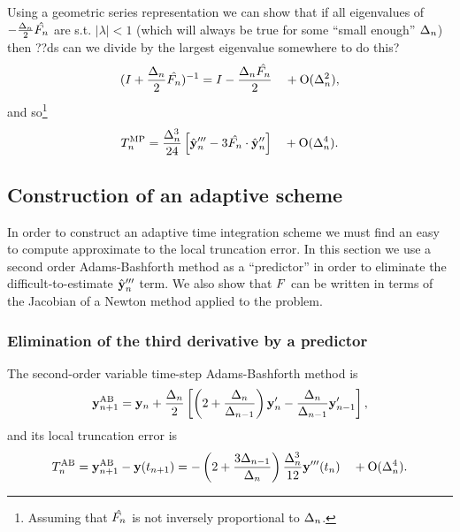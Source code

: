 Using a geometric series representation we can show that if all eigenvalues of  $-\frac{\Delta_{n}}{2}\hat{F_{n}}$ are s.t. $|\lambda| < 1$\cite{??ds} (which will always be true for some ``small enough'' $\Delta_{n}$) then
??ds can we divide by the largest eigenvalue somewhere to do this?
\begin{equation}
  (I + \frac{\Delta_{n}}{2}\hat{F_{n}})^{-1} = I - \frac{\Delta_{n} \hat{F_{n}}}{2}  \quad + \text{O}(\Delta_{n}^2),
\end{equation}
and so\footnote{Assuming that $\hat{F_{n}}$ is not inversely proportional to $\Delta_{n}$.}
\begin{equation}
   T_n^{\text{MP}} = \frac{\Delta_{n}^3}{24} \left[\hat{\mathbf{y}}_{n}''' - 3 \hat{F_{n}} \cdot \hat{\mathbf{y}}_{n}'' \right]
   \quad +\text{O}(\Delta_{n}^4).
  \label{eq:trunc-final}
\end{equation}

\subsection{Construction of an adaptive scheme}

In order to construct an adaptive time integration scheme we must find an easy to compute approximate to the local truncation error.
In this section we use a second order Adams-Bashforth method as a ``predictor'' in order to eliminate the difficult-to-estimate $\hat{\mathbf{y}}_{n}'''$ term.\cite[p.707]{Gresho-Sani}
We also show that $F$ can be written in terms of the Jacobian of a Newton method applied to the problem.

\subsubsection{Elimination of the third derivative by a predictor}
The second-order variable time-step Adams-Bashforth method is\cite[p.267]{Gresho-Sani}
\begin{equation}
  \mathbf{y}_{n+1}^{\text{AB}} = \mathbf{y}_n + \frac{\Delta_{n}}{2} \left[
    \left (2 + \frac{\Delta_{n}}{\Delta_{n-1}} \right) \mathbf{y}'_n
    - \frac{\Delta_{n}}{\Delta_{n-1}} \mathbf{y}'_{n-1}
    \right],
  \label{eq:AB2}
\end{equation}
and its local truncation error is\cite[p.267]{Gresho-Sani}
\begin{equation}
  T_n^{\text{AB}} = \mathbf{y}_{n+1}^{\text{AB}} - \mathbf{y}(t_{n+1})
  = - \left( 2 + \frac{3 \Delta_{n-1}}{\Delta_{n}} \right) \frac{\Delta_{n}^3}{12} \mathbf{y}'''(t_n)
  \quad + \text{O}(\Delta_{n}^4).
  \label{eq:AB2LTE}
\end{equation}


